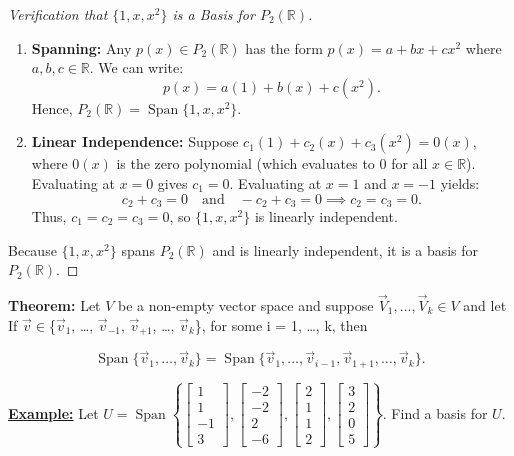 \begin{proof}[Verification that $\{1, x, x^2\}$ is a Basis for $P_2(\mathbb{R})$]
\begin{enumerate}[itemsep=0.8em, topsep=0.5em]
    \item \textbf{Spanning:} Any $p(x) \in P_2(\mathbb{R})$ has the form $p(x) = a + bx + cx^2$ where $a, b, c \in \mathbb{R}$. We can write:
    \[
    p(x) = a(1) + b(x) + c(x^2).
    \]
    Hence, $P_2(\mathbb{R}) = \operatorname{Span}\{1, x, x^2\}$.
    \medskip
    \item \textbf{Linear Independence:} Suppose $c_1(1) + c_2(x) + c_3(x^2) = 0(x)$, where $0(x)$ is the zero polynomial (which evaluates to $0$ for all $x \in \mathbb{R}$). 
    Evaluating at $x = 0$ gives $c_1 = 0$. 
    Evaluating at $x = 1$ and $x = -1$ yields:
    \[
    c_2 + c_3 = 0 \quad \text{and} \quad -c_2 + c_3 = 0 \implies c_2 = c_3 = 0.
    \]
    Thus, $c_1 = c_2 = c_3 = 0$, so $\{1, x, x^2\}$ is linearly independent.
\end{enumerate}
Because $\{1, x, x^2\}$ spans $P_2(\mathbb{R})$ and is linearly independent, it is a basis for $P_2(\mathbb{R})$.
\end{proof}

\medskip

\noindent \textbf{Theorem:} Let $V$ be a non-empty vector space and suppose $\vec{V}_1, \dots, \vec{V}_k \in V$ and let
If $\vec{v} \in $\{$\vec{v}_1$, \dots, $\vec{v}_{-1}$, $\vec{v}_{+1}$, \dots, $\vec{v}_k$\}, for some i = 1, \dots, k, then

\[ 
\operatorname{Span}\{\vec{v}_1, \dots, \vec{v}_k\}
=
\operatorname{Span}\{\vec{v}_1, \dots, \vec{v}_{i-1}, \vec{v}_{1+1}, \dots, \vec{v}_k\}.
\]

\bigskip
\noindent
\underline{\textbf{Example:}} Let $U = \operatorname{Span}\left\{
\begin{bmatrix} 1 \\ 1 \\ -1 \\ 3 \end{bmatrix},
\begin{bmatrix} -2 \\ -2 \\ 2 \\ -6 \end{bmatrix},
\begin{bmatrix} 2 \\ 1 \\ 1 \\ 2 \end{bmatrix},
\begin{bmatrix} 3 \\ 2 \\ 0 \\ 5 \end{bmatrix}
\right\}$. Find a basis for $U$.


